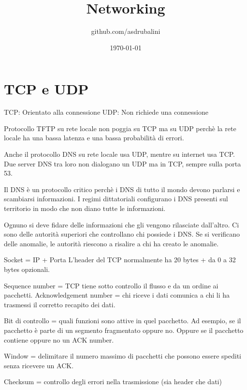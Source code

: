 \documentclass{article}
\title{Networking}
\author{github.com/asdrubalini}
\date{\today}
\begin{document}
    \maketitle

    \section{TCP e UDP}
    TCP: Orientato alla connessione
    UDP: Non richiede una connessione

    Protocollo TFTP su rete locale non poggia su TCP ma su UDP perchè la rete locale ha una bassa latenza e una bassa probabilità di errori.

    Anche il protocollo DNS su rete locale usa UDP, mentre su internet usa TCP.
    Due server DNS tra loro non dialogano un UDP ma in TCP, sempre sulla porta 53.

    Il DNS è un protocollo critico perchè i DNS di tutto il mondo devono parlarsi e scambiarsi informazioni. I regimi dittatoriali configurano i DNS presenti sul territorio in modo che non diano tutte le informazioni.

    Ognuno si deve fidare delle informazioni che gli vengono rilasciate dall'altro.
    Ci sono delle autorità superiori che controllano chi possiede i DNS. Se si verificano delle anomalie, le autorità riescono a risalire a chi ha creato le anomalie.

    Socket = IP + Porta
    L'header del TCP normalmente ha 20 bytes + da 0 a 32 bytes opzionali.

    Sequence number = TCP tiene sotto controllo il flusso e da un ordine ai pacchetti.
    Acknowledgement number = chi riceve i dati comunica a chi li ha trasmessi il corretto recapito dei dati.

    Bit di controllo = quali funzioni sono attive in quel pacchetto. Ad esempio, se il pacchetto è parte di un segmento fragmentato oppure no. Oppure se il pacchetto contiene oppure no un ACK number.

    Window = delimitare il numero massimo di pacchetti che possono essere spediti senza ricevere un ACK.

    Checksum = controllo degli errori nella trasmissione (sia header che dati)
\end{document}
